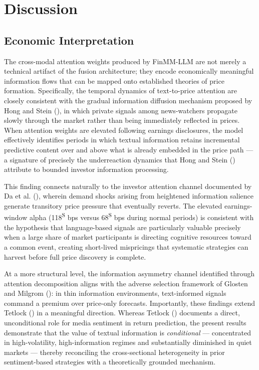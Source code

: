 \documentclass[
  11pt,
  a4paper,
]{article}
\begin{document}
\section{Discussion}\label{discussion}

\subsection{Economic Interpretation}\label{economic-interpretation}

The cross-modal attention weights produced by FinMM-LLM are not merely a
technical artifact of the fusion architecture; they encode economically
meaningful information flows that can be mapped onto established
theories of price formation. Specifically, the temporal dynamics of
text-to-price attention are closely consistent with the gradual
information diffusion mechanism proposed by Hong and Stein
(), in which private signals among
news-watchers propagate slowly through the market rather than being
immediately reflected in prices. When attention weights are elevated
following earnings disclosures, the model effectively identifies periods
in which textual information retains incremental predictive content over
and above what is already embedded in the price path --- a signature of
precisely the underreaction dynamics that Hong and Stein
() attribute to bounded investor
information processing.

This finding connects naturally to the investor attention channel
documented by Da et al. (), wherein demand
shocks arising from heightened information salience generate transitory
price pressure that eventually reverts. The elevated earnings-window
alpha (118\textsuperscript{S} bps versus 68\textsuperscript{S} bps
during normal periods) is consistent with the hypothesis that
language-based signals are particularly valuable precisely when a large
share of market participants is directing cognitive resources toward a
common event, creating short-lived mispricings that systematic
strategies can harvest before full price discovery is complete.

At a more structural level, the information asymmetry channel identified
through attention decomposition aligns with the adverse selection
framework of Glosten and Milgrom
(): in thin information
environments, text-informed signals command a premium over price-only
forecasts. Importantly, these findings extend Tetlock
() in a meaningful direction. Whereas
Tetlock () documents a direct,
unconditional role for media sentiment in return prediction, the present
results demonstrate that the value of textual information is
\emph{conditional} --- concentrated in high-volatility, high-information
regimes and substantially diminished in quiet markets --- thereby
reconciling the cross-sectional heterogeneity in prior sentiment-based
strategies with a theoretically grounded mechanism.
\end{document}
